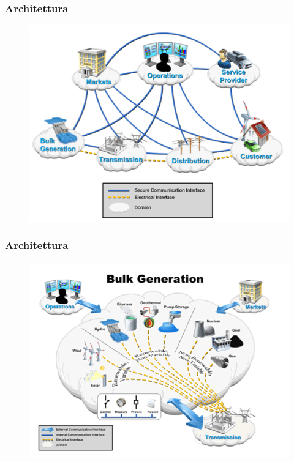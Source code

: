 
\begin{frame}[fragile]
  \frametitle{Architettura}
	\begin{figure}[h] 
		\includegraphics[scale=0.5]{imgs/sg.png}
	\end{figure}
\end{frame}

\begin{frame}[fragile]
  \frametitle{Architettura}
	\begin{figure}[h] 
		\includegraphics[scale=0.5]{imgs/gen.png}
	\end{figure}
\end{frame}